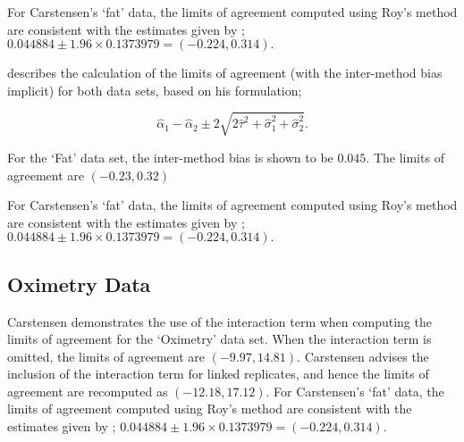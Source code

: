 \documentclass[12pt, a4paper]{article}
\theoremstyle{plain}
\theoremstyle{definition}
\theoremstyle{remark}
\begin{document}
For Carstensen's `fat' data, the limits of agreement computed using Roy's
method are consistent with the estimates given by \citet{BXC2008}; $0.044884  \pm 1.96 \times  0.1373979 = (-0.224,  0.314).$	


\citet{bxc2008} describes the calculation of the limits of agreement (with the inter-method bias implicit) for both data sets, based on his formulation;

\[\hat{\alpha}_1 - \hat{\alpha}_2 \pm 2\sqrt{2\hat{\tau}^2 +\hat{\sigma}_1^2 +\hat{\sigma}_2^2 }.\]

For the `Fat' data set, the inter-method bias is shown to be $0.045$. The limits of agreement are $(-0.23 , 0.32)$



For Carstensen's `fat' data, the limits of agreement computed using Roy's
method are consistent with the estimates given by \citet{BXC2008}; $0.044884  \pm 1.96 \times  0.1373979 = (-0.224,  0.314).$


\subsection{Oximetry Data}
Carstensen demonstrates the use of the interaction term when computing the limits of agreement for the `Oximetry' data set. When the interaction term is omitted, the limits of agreement are $(-9.97, 14.81)$. Carstensen advises the inclusion of the interaction term for linked replicates, and hence the limits of agreement are recomputed as $(-12.18,17.12)$.
\newpage
For Carstensen's `fat' data, the limits of agreement computed using Roy's
method are consistent with the estimates given by \citet{BXC2008}; $0.044884  \pm 1.96 \times  0.1373979 = (-0.224,  0.314).$


	
\end{document}

